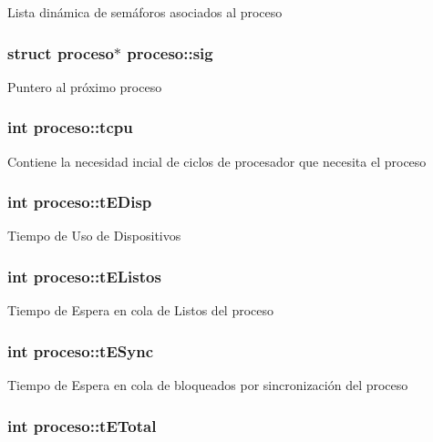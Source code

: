 Lista dinámica de semáforos asociados al proceso \hypertarget{structproceso_a527a2b7861991b9c7979d5c645352cc2}{
\subsubsection[{sig}]{\setlength{\rightskip}{0pt plus 5cm}struct {\bf proceso}$\ast$ proceso\-::sig}}\label{structproceso_a527a2b7861991b9c7979d5c645352cc2}
Puntero al próximo proceso \hypertarget{structproceso_a7ec78adcdc6632a7b55b82188b44f76c}{
\subsubsection[{tcpu}]{\setlength{\rightskip}{0pt plus 5cm}int proceso\-::tcpu}}\label{structproceso_a7ec78adcdc6632a7b55b82188b44f76c}
Contiene la necesidad incial de ciclos de procesador que necesita el proceso \hypertarget{structproceso_ada33fb9deff92396af71daf15bd7e16e}{
\subsubsection[{t\-E\-Disp}]{\setlength{\rightskip}{0pt plus 5cm}int proceso\-::t\-E\-Disp}}\label{structproceso_ada33fb9deff92396af71daf15bd7e16e}
Tiempo de Uso de Dispositivos \hypertarget{structproceso_a261b77df7e4d69192d99695e215def2d}{
\subsubsection[{t\-E\-Listos}]{\setlength{\rightskip}{0pt plus 5cm}int proceso\-::t\-E\-Listos}}\label{structproceso_a261b77df7e4d69192d99695e215def2d}
Tiempo de Espera en cola de Listos del proceso \hypertarget{structproceso_a3d8d10b6de4414cfcc790f34596d2992}{
\subsubsection[{t\-E\-Sync}]{\setlength{\rightskip}{0pt plus 5cm}int proceso\-::t\-E\-Sync}}\label{structproceso_a3d8d10b6de4414cfcc790f34596d2992}
Tiempo de Espera en cola de bloqueados por sincronización del proceso \hypertarget{structproceso_aedc45b7bfd0247a2eae4e75ee8e89e63}{
\subsubsection[{t\-E\-Total}]{\setlength{\rightskip}{0pt plus 5cm}int proceso\-::t\-E\-Total}}\label{structproceso_aedc45b7bfd0247a2eae4e75ee8e89e63}
